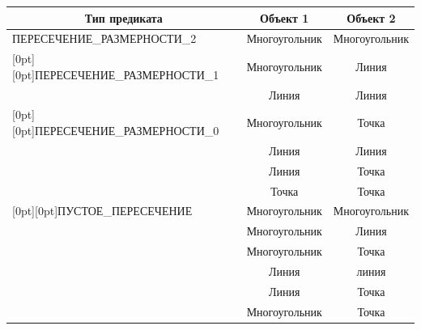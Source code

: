 \begin{table}\small


\begin{center}




\vspace*{2ex}





\begin{tabular}{|l|c|c|}


\hline


\multicolumn{1}{|c|}{Тип предиката}& Объект 1 & Объект 2 \\


\hline


ПЕРЕСЕЧЕНИЕ\_РАЗМЕРНОСТИ\_2 &Многоугольник &Многоугольник\\ 


\hline


\multicolumn{1}{|l|}{\raisebox{-6pt}[0pt][0pt]{ПЕРЕСЕЧЕНИЕ\_РАЗМЕРНОСТИ\_1}} &Многоугольник & Линия \\


& Линия & Линия \\


\hline


\multicolumn{1}{|l|}{\raisebox{-18pt}[0pt][0pt]{ПЕРЕСЕЧЕНИЕ\_РАЗМЕРНОСТИ\_0}} &Многоугольник& Точка \\


&Линия & Линия \\


&Линия & Точка \\


&Точка &Точка \\


\hline


\multicolumn{1}{|l|}{\raisebox{-28pt}[0pt][0pt]{ПУСТОЕ\_ПЕРЕСЕЧЕНИЕ}}&Многоугольник &Многоугольник\\


&Многоугольник &Линия\\


&Многоугольник&Точка \\


& Линия &линия \\


& Линия & Точка \\


&Многоугольник& Точка \\


     \hline


     \end{tabular}


     \end{center}


     \vspace*{-6pt}


     \end{table}


